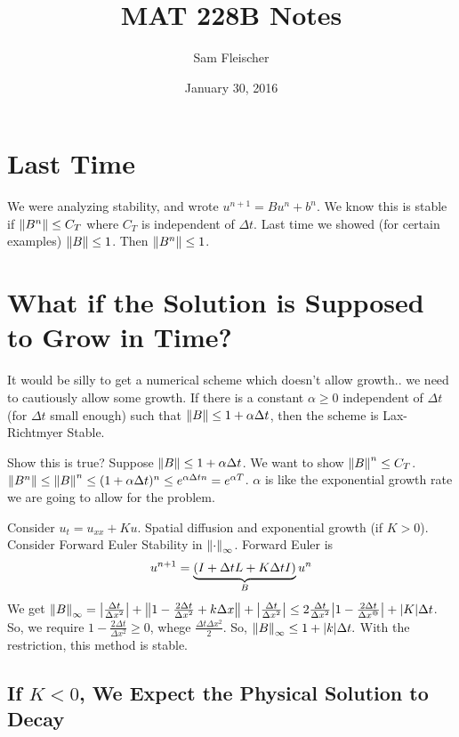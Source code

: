 \documentclass{article}
\title{MAT 228B Notes}
\author{Sam Fleischer}
\date{January 30, 2016}
\newcommand{\Dx}{\Delta x}
\newcommand{\Dt}{\Delta t}
\begin{document}
    \maketitle

    \section{Last Time}

        We were analyzing stability, and wrote $u^{n+1} = Bu^n + b^n$.  We know this is stable if $\norm{B^n} \leq C_T$ where $C_T$ is independent of $\Dt$.  Last time we showed (for certain examples) $\norm{B} \leq 1$.  Then $\norm{B^n} \leq 1$.

    \section{What if the Solution is Supposed to Grow in Time?}

        It would be silly to get a numerical scheme which doesn't allow growth.. we need to cautiously allow some growth.  If there is a constant $\alpha \geq 0$ independent of $\Dt$ (for $\Dt$ small enough) such that $\norm{B} \leq 1 + \alpha\Dt$, then the scheme is Lax-Richtmyer Stable.
        \begin{adjustwidth}{1in}{1in}
            Show this is true?  Suppose $\norm{B} \leq 1 + \alpha \Dt$.  We want to show $\norm{B}^n \leq C_T$.  $\norm{B^n} \leq \norm{B}^n \leq (1 + \alpha\Dt)^n \leq e^{\alpha\Dt n} = e^{\alpha T}$.  $\alpha$ is like the exponential growth rate we are going to allow for the problem.
        \end{adjustwidth}
        Consider $u_t = u_{xx} + Ku$.  Spatial diffusion and exponential growth (if $K > 0$).  Consider Forward Euler Stability in $\norm{\cdot}_\infty$.  Forward Euler is
        \begin{align*}
            u^{n+1} = \underbrace{\qty(I + \Dt L + K\Dt I)}_Bu^n
        \end{align*}
        We get $\norm{B}_\infty = \abs{\frac{\Dt}{\Dx^2}} + \norm{1 - \frac{2\Dt}{\Dx^2} + k\Dx} + \abs{\frac{\Dt}{\Dx^2}} \leq 2\frac{\Dt}{\Dx^2} \abs{1 - \frac{2\Dt}{\Dx^@}} + \abs{K}\Dt$.  So, we require $1 - \frac{2\Dt}{\Dx^2} \geq 0$, whege $\frac{\Dt\Dx^2}{2}$.  So, $\norm{B}_\infty \leq 1 + \abs{k}\Dt.$  With the restriction, this method is stable.

        \subsection{If $K < 0$, We Expect the Physical Solution to Decay}
\end{document}
